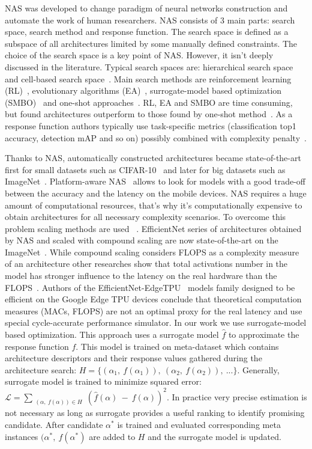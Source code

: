 \documentclass[letterpaper]{article}
\begin{document}
NAS was developed to change paradigm of neural networks construction and automate the work of  human researchers. NAS consists of 3 main parts: search space, search method and response function. The search space is defined as a subspace of all architectures limited by some manually defined constraints. The choice of the search space is a key point of NAS. However, it isn't deeply discussed in the literature. Typical search spaces are: hierarchical search space~\cite{tan2019mnasnet} and cell-based search space~\cite{ZophNasNet}. Main search  methods are reinforcement learning (RL)~\cite{zoph2016RL}, evolutionary algorithms (EA)~\cite{AmoebaReal}, surrogate-model based optimization (SMBO)~\cite{PNASNet,luo2019neural} and one-shot approaches~\cite{DARTS}. RL, EA and SMBO are time consuming, but found architectures outperform to those found by one-shot method~\cite{NASSurvey}. As a response function authors typically use task-specific metrics (classification top1 accuracy, detection mAP and so on) possibly combined with complexity penalty~\cite{ProxylessNAS}.

Thanks to NAS, automatically constructed architectures became state-of-the-art first for small datasets such as CIFAR-10~\cite{wang2021sampleefficient} and later for big datasets such as ImageNet~\cite{tan2020efficientnet}. 
Platform-aware NAS~\cite{tan2019mnasnet} allows to look for models with a good trade-off between the accuracy and the latency on the mobile devices. NAS requires a huge amount of computational resources, that's why it's computationally expensive to obtain architectures for all necessary complexity scenarios. To overcome this problem scaling methods are used ~\cite{tan2020efficientnet}. EfficientNet series of architectures obtained by NAS and scaled with compound scaling are now state-of-the-art on the ImageNet~\cite{pham2021meta}. While compound scaling considers FLOPS as a complexity measure of an architecture other researches show that total activations number in the model has stronger influence to the latency on the real hardware than the FLOPS~\cite{radosavovic2020designing}. Authors of the EfficientNet-EdgeTPU~\cite{gupta2020acceleratoraware} models family designed to be efficient on the Google Edge TPU devices conclude that theoretical computation measures (MACs, FLOPS) are not an optimal proxy for the real latency and use special cycle-accurate performance simulator.
In our work we use surrogate-model based optimization. This approach uses a surrogate model $\hat{f}$ to approximate the response function $f$. This model is trained on meta-dataset which contains architecture descriptors and their response values gathered during the architecture search: $H=\{(\alpha_1,~f(\alpha_1)),~(\alpha_2,~f(\alpha_2)),~...\}$. Generally, surrogate model is trained to minimize squared error: $\mathcal{L}=\sum_{\substack{(\alpha,~f(\alpha)) \in H}}(\hat{f}(\alpha)~-~f(\alpha))^2$. In practice very precise estimation is not necessary as long as surrogate provides a useful ranking to identify promising candidate. After candidate $\alpha^*$ is trained and evaluated corresponding meta instances $(\alpha^*,~f(\alpha^*)$ are added to $H$ and the surrogate model is updated.
\end{document}
